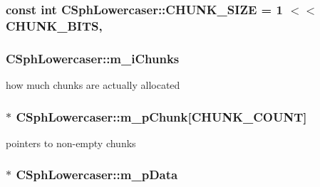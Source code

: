 \hypertarget{classCSphLowercaser_ae1d932fca473265a6dc9d48836cdb4ec}{
\subsubsection[{C\-H\-U\-N\-K\-\_\-\-S\-I\-Z\-E}]{\setlength{\rightskip}{0pt plus 5cm}const {\bf int} C\-Sph\-Lowercaser\-::\-C\-H\-U\-N\-K\-\_\-\-S\-I\-Z\-E = 1 $<$$<$ {\bf C\-H\-U\-N\-K\-\_\-\-B\-I\-T\-S}\hspace{0.3cm}{\ttfamily [static]}, {\ttfamily [protected]}}}\label{classCSphLowercaser_ae1d932fca473265a6dc9d48836cdb4ec}
\hypertarget{classCSphLowercaser_a7d538ec8b5bb2220faa56d9b6a1032a0}{
\subsubsection[{m\-\_\-i\-Chunks}]{ C\-Sph\-Lowercaser\-::m\-\_\-i\-Chunks\hspace{0.3cm}{\ttfamily [protected]}}}\label{classCSphLowercaser_a7d538ec8b5bb2220faa56d9b6a1032a0}


how much chunks are actually allocated 

\hypertarget{classCSphLowercaser_adead3a3167621d8d6f10b5d2bd14ea9e}{
\subsubsection[{m\-\_\-p\-Chunk}]{$\ast$ C\-Sph\-Lowercaser\-::m\-\_\-p\-Chunk\mbox{[}{\bf C\-H\-U\-N\-K\-\_\-\-C\-O\-U\-N\-T}\mbox{]}\hspace{0.3cm}{\ttfamily [protected]}}}\label{classCSphLowercaser_adead3a3167621d8d6f10b5d2bd14ea9e}


pointers to non-\/empty chunks 

\hypertarget{classCSphLowercaser_a0534fc1680554432be7358d8fe374dc2}{
\subsubsection[{m\-\_\-p\-Data}]{$\ast$ C\-Sph\-Lowercaser\-::m\-\_\-p\-Data\hspace{0.3cm}{\ttfamily [protected]}}}\label{classCSphLowercaser_a0534fc1680554432be7358d8fe374dc2}


